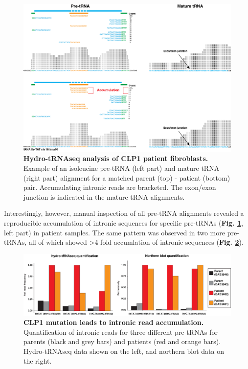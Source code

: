 \documentclass[12pt]{rockefeller}
\begin{document}
\begin{figure}[!ht]%
\centering
\includegraphics[width=\textwidth]{clp1align.png}%
\caption[Hydro-tRNAseq analysis of CLP1 patient fibroblasts.]{\textbf{Hydro-tRNAseq analysis of CLP1 patient fibroblasts.} 
Example of an isoleucine pre-tRNA (left part) and mature tRNA (right part) alignment for a matched parent (top) - patient (bottom) pair. Accumulating intronic reads are bracketed. The exon/exon junction is indicated in the mature tRNA alignments.}
\centering
\label{clp1align}%
\end{figure}

Interestingly, however, manual inspection of all pre-tRNA alignments revealed a reproducible accumulation of intronic sequences for specific pre-tRNAs (\textbf{Fig. \ref{clp1align}}, left part) in patient samples. The same pattern was observed in two more pre-tRNAs, all of which showed >4-fold accumlation of intronic sequences (\textbf{Fig. \ref{clp1bars2}}).

\begin{figure}[!ht]%
\centering
\includegraphics[width=\textwidth]{clp1bars2.png}%
\caption[CLP1 mutation leads to intronic read accumulation.]
{\textbf{CLP1 mutation leads to intronic read accumulation.}
Quantification of intronic reads for three different pre-tRNAs for parents (black and grey bars) and patients (red and orange bars). Hydro-tRNAseq data shown on the left, and northern blot data on the right.}
\centering
\label{clp1bars2}%
\end{figure}
\end{document}
